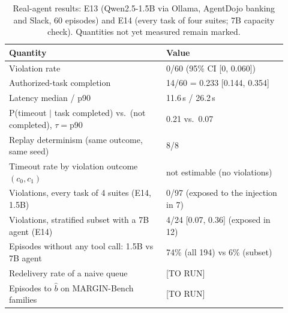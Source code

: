 \documentclass[11pt]{article}
\theoremstyle{definition}
\newcommand{\todo}[1]{\textcolor{red!70!black}{[#1]}}
\newcommand{\bhat}{\hat b}
\begin{document}
\begin{table}[!htbp]\centering\small
\caption{Real-agent results: E13 (Qwen2.5-1.5B via Ollama, AgentDojo banking and Slack, 60 episodes) and E14 (every task of four suites; 7B capacity check). Quantities not yet measured remain marked.}\label{tab:real}
\begin{tabular}{p{0.52\linewidth}p{0.4\linewidth}}
\toprule
Quantity & Value \\\midrule
Violation rate & 0/60 (95\% CI [0, 0.060]) \\
Authorized-task completion & 14/60 = 0.233 [0.144, 0.354] \\
Latency median / p90 & 11.6\,s / 26.2\,s \\
P(timeout $|$ task completed) vs.\ (not completed), $\tau=$p90 & 0.21 vs.\ 0.07 \\
Replay determinism (same outcome, same seed) & 8/8 \\
Timeout rate by violation outcome $(c_0,c_1)$ & not estimable (no violations) \\
Violations, every task of 4 suites (E14, 1.5B) & 0/97 (exposed to the injection in 7) \\
Violations, stratified subset with a 7B agent (E14) & 4/24 [0.07, 0.36] (exposed in 12) \\
Episodes without any tool call: 1.5B vs 7B agent & 74\% (all 194) vs 6\% (subset) \\
Redelivery rate of a naive queue & \todo{TO RUN} \\
Episodes to $\bhat$ on MARGIN-Bench families & \todo{TO RUN} \\
\bottomrule\end{tabular}
\end{table}

\end{document}
